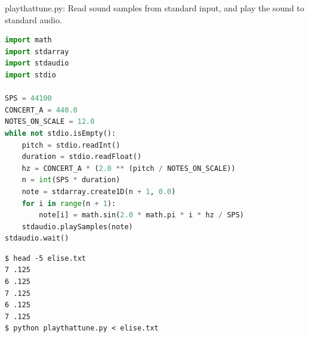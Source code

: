 \documentclass[8pt,a4paper,compress]{beamer}
\begin{document}
\begin{frame}[fragile]
\pause

\begin{framed}
\tiny playthattune.py: Read sound samples from standard input, and play the sound to standard audio.
\end{framed}

\begin{lstlisting}[language=Python]
import math
import stdarray
import stdaudio
import stdio

SPS = 44100
CONCERT_A = 440.0
NOTES_ON_SCALE = 12.0
while not stdio.isEmpty():
    pitch = stdio.readInt()
    duration = stdio.readFloat()
    hz = CONCERT_A * (2.0 ** (pitch / NOTES_ON_SCALE))
    n = int(SPS * duration)
    note = stdarray.create1D(n + 1, 0.0)
    for i in range(n + 1):
        note[i] = math.sin(2.0 * math.pi * i * hz / SPS)
    stdaudio.playSamples(note)
stdaudio.wait()
\end{lstlisting}

\pause

\begin{minipage}{150pt}
\begin{lstlisting}[language={}]
$ head -5 elise.txt
7 .125 
6 .125 
7 .125 
6 .125 
7 .125 
$ python playthattune.py < elise.txt
\end{lstlisting}
\end{minipage}%
\begin{minipage}{150pt}
\hfill {}
\end{minipage}
\end{frame}
\end{document}
